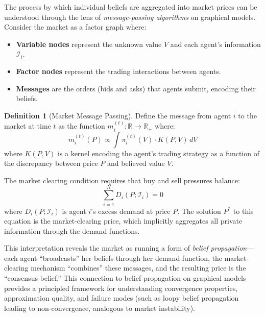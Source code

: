 \documentclass[12pt,a4paper]{article}
\theoremstyle{definition}
\newtheorem{definition}[theorem]{Definition}
\newcommand{\R}{\mathbb{R}}
\newcommand{\I}{\mathcal{I}}
\begin{document}
The process by which individual beliefs are aggregated into market prices can be understood through the lens of \emph{message-passing algorithms} on graphical models. Consider the market as a factor graph where:

\begin{itemize}
    \item \textbf{Variable nodes} represent the unknown value $V$ and each agent's information $\I_i$.
    \item \textbf{Factor nodes} represent the trading interactions between agents.
    \item \textbf{Messages} are the orders (bids and asks) that agents submit, encoding their beliefs.
\end{itemize}

\begin{definition}[Market Message Passing]\label{def:message_passing}
Define the message from agent $i$ to the market at time $t$ as the function $m_i^{(t)}: \R \to \R_+$ where:
\begin{equation}
    m_i^{(t)}(P) \propto \int \pi_i^{(t)}(V) \cdot K(P, V) \, dV
\end{equation}
where $K(P,V)$ is a kernel encoding the agent's trading strategy as a function of the discrepancy between price $P$ and believed value $V$.
\end{definition}

The market clearing condition requires that buy and sell pressures balance:
\begin{equation}\label{eq:market_clearing}
    \sum_{i=1}^{N} D_i(P; \I_i) = 0
\end{equation}
where $D_i(P; \I_i)$ is agent $i$'s excess demand at price $P$. The solution $P^*$ to this equation is the market-clearing price, which implicitly aggregates all private information through the demand functions.

This interpretation reveals the market as running a form of \emph{belief propagation}---each agent ``broadcasts'' her beliefs through her demand function, the market-clearing mechanism ``combines'' these messages, and the resulting price is the ``consensus belief.'' This connection to belief propagation on graphical models provides a principled framework for understanding convergence properties, approximation quality, and failure modes (such as loopy belief propagation leading to non-convergence, analogous to market instability).


\end{document}
